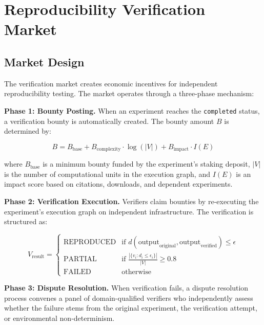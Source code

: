\section{Reproducibility Verification Market}

\label{sec:market}

\subsection{Market Design}

The verification market creates economic incentives for independent reproducibility testing.
The market operates through a three-phase mechanism:

\textbf{Phase 1: Bounty Posting.}
When an experiment reaches the \texttt{completed} status, a verification bounty is automatically created.
The bounty amount $B$ is determined by:

\begin{equation}
    B = B_{\text{base}} + B_{\text{complexity}} \cdot \log(|V|) + B_{\text{impact}} \cdot I(E)
\end{equation}

\noindent where $B_{\text{base}}$ is a minimum bounty funded by the experiment's staking deposit, $|V|$ is the number of computational units in the execution graph, and $I(E)$ is an impact score based on citations, downloads, and dependent experiments.

\textbf{Phase 2: Verification Execution.}
Verifiers claim bounties by re-executing the experiment's execution graph on independent infrastructure.
The verification is structured as:

\begin{equation}
    V_{\text{result}} = \begin{cases}
        \text{REPRODUCED} & \text{if } d(\text{output}_{\text{original}}, \text{output}_{\text{verified}}) \leq \epsilon \\
        \text{PARTIAL} & \text{if } \frac{|\{v_i : d_i \leq \epsilon_i\}|}{|V|} \geq 0.8 \\
        \text{FAILED} & \text{otherwise}
    \end{cases}
\end{equation}

\textbf{Phase 3: Dispute Resolution.}
When verification fails, a dispute resolution process convenes a panel of domain-qualified verifiers who independently assess whether the failure stems from the original experiment, the verification attempt, or environmental non-determinism.

